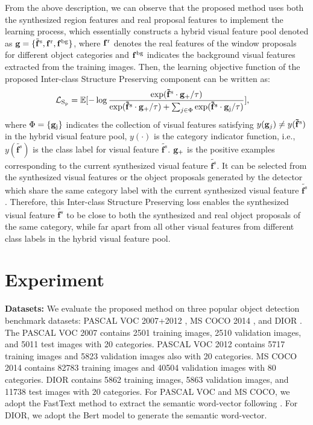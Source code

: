 \documentclass[10pt,twocolumn,letterpaper]{article}
\begin{document}
From the above description, we can observe that the proposed method uses both the synthesized region features and real proposal features to implement the learning process, which essentially constructs a hybrid visual feature pool denoted as $\mathbf{g}=\{{\tilde{\mathbf{f}}^{\rm s},\mathbf{f}^{\rm r},\mathbf{f}^{\rm bg}}\}$, where $\mathbf{f}^{\rm r}$ denotes the real features of the window proposals for different object categories and $\mathbf{f}^{\rm bg}$ indicates the background visual features extracted from the training images. Then, the learning objective function of the proposed Inter-class Structure Preserving component can be written as:
\begin{align}
& \mathcal{L}_{\rm S_p}=\mathbb{E}[- \log \frac{\mathrm{exp}(\mathbf{\tilde{f}}^{\rm s} \cdot \mathbf{\mathbf{g}_{+}}/\tau)}{\mathrm{exp}(\mathbf{\tilde{f}}^{\rm s} \cdot \mathbf{g}_{\rm +}/\tau) + \sum_{j\in\Phi}\mathrm{exp}(\mathbf{\tilde{f}}^{\rm s} \cdot \mathbf{g}_{\rm j}/\tau)}],
\end{align}
where $\Phi=\{{\mathbf g}_{\rm j}\}$ indicates the collection of visual features satisfying $y(\mathbf{g}_j)\neq y(\mathbf{\tilde{f}}^{\rm s})$ in the hybrid visual feature pool, $y(\cdot)$ is the category indicator function, i.e., $y(\tilde{\textbf{f}^s})$ is the class label for visual feature $\tilde{\textbf{f}^s}$. $\mathbf g_{\rm +}$ is the positive examples corresponding to the current synthesized visual feature $\tilde{\textbf{f}^s}$. It can be selected from the synthesized visual features or the object proposals generated by the detector which share the same category label with the current synthesized visual feature $\tilde{\textbf{f}^s}$. Therefore, this Inter-class Structure Preserving loss enables the synthesized visual feature $\tilde{\textbf{f}^s}$ to be close to both the synthesized and real object proposals of the same category, while far apart from all other visual features from different class labels in the hybrid visual feature pool.






\section{Experiment}
\textbf{Datasets:} We evaluate the proposed method on three popular object detection benchmark datasets:  PASCAL VOC 2007+2012 \cite{everingham2010pascal}, MS COCO 2014 \cite{lin2014microsoft}, and DIOR \cite{li2020object}.  The  PASCAL VOC 2007 contains 2501 training images, 2510 validation images, and 5011 test images with 20 categories. PASCAL VOC 2012 contains 5717 training images and 5823 validation images also with 20 categories. MS COCO 2014 contains 82783 training images and 40504 validation images with 80 categories. DIOR contains 5862 training images, 5863 validation images, and 11738 test images with 20 categories. For PASCAL VOC and MS COCO,  we adopt the FastText method \cite{mikolov-etal-2018-advances} to extract the semantic word-vector following \cite{hayat2020synthesizing}. For DIOR, we adopt the Bert model \cite{devlin2018bert} to generate the semantic word-vector.
\end{document}
